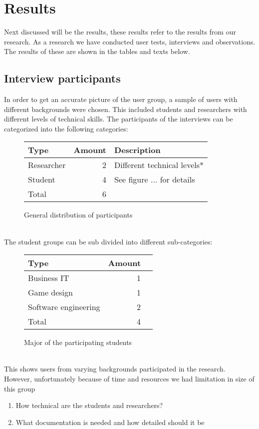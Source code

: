 \documentclass[conference]{IEEEtran}
\begin{document}
\section{Results}

Next discussed will be the results, these results refer to the results from our research. As a research we have conducted user tests, interviews and observations. The results of these are shown in the tables and texts below. \\ 

		\begin{figure*}[ht]
	\subsection{Interview participants}
		In order to get an accurate picture of the user group, a sample of users with different backgrounds were chosen. This included students and researchers with different levels of technical skills. The participants of the interviews can be categorized into the following categories:
		\begin{figure}[ht]
			\centering
			\begin{tabular}{ | l | r | l | }
				\hline
				Type			& Amount	& Description \\ \hline \hline
				Researcher		& 2			& Different technical levels* \\ \hline
				Student			& 4			& See figure ... for details \\ \hline \hline
				Total			& 6			& \\ \hline
			\end{tabular}
			\caption{General distribution of participants}
		\end{figure}\\
		The student groups can be sub divided into different sub-categories:
		\begin{figure}[ht]
			\centering
			\begin{tabular}{ | l | r | l | }
				\hline
				Type					& Amount \\ \hline \hline
				Business IT				& 1 \\ \hline
				Game design				& 1 \\ \hline
				Software engineering	& 2 \\ \hline
				Total					& 4 \\ \hline
			\end{tabular}
			\caption{Major of the participating students}
		\end{figure} \\
		This shows users from varying backgrounds participated in the research. However, unfortunately because of time and resources we had limitation in size of this group
		\begin{enumerate}
			\item How technical are the students and researchers?
				\item What documentation is needed and how detailed should it be
				



\end{enumerate}
\end{figure*}
\end{document}
